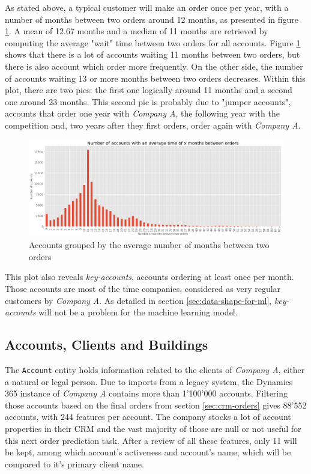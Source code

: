 As stated above, a typical customer will make an order once per year, with a number of months between two orders around 12 months, as presented in figure \ref{fig:orders-account-counts}. A mean of 12.67 months and a median of 11 months are retrieved by computing the average "wait" time between two orders for all accounts. Figure \ref{fig:orders-account-counts} shows that there is a lot of accounts waiting 11 months between two orders, but there is also account which order more frequently. On the other side, the number of accounts waiting 13 or more months between two orders decreases. Within this plot, there are two pics: the first one logically around 11 months and a second one around 23 months. This second pic is probably due to "jumper accounts", accounts that order one year with \textit{Company A}, the following year with the competition and, two years after they first orders, order again with \textit{Company A}. 

\begin{figure}[h]
    \centering
    \includegraphics[width=15cm]{images/accounts-average-time-orders.png}
    \caption{Accounts grouped by the average number of months between two orders}
    \label{fig:orders-account-counts}
\end{figure}

This plot also reveals \textit{key-accounts}, accounts ordering at least once per month. Those accounts are most of the time companies, considered as very regular customers by \textit{Company A}. As detailed in section \ref{sec:data-shape-for-ml}, \textit{key-accounts} will not be a problem for the machine learning model.





\subsection{Accounts, Clients and Buildings}\label{sec:crm-accounts}
The \texttt{Account} entity holds information related to the clients of \textit{Company A}, either a natural or legal person. Due to imports from a legacy system, the Dynamics 365 instance of \textit{Company A} contains more than 1'100'000 accounts. Filtering those accounts based on the final orders from section \ref{sec:crm-orders} gives 88'552 accounts, with 244 features per account. The company stocks a lot of account properties in their CRM and the vast majority of those are null or not useful for this next order prediction task. After a review of all these features, only 11 will be kept, among which account's activeness and account's name, which will be compared to it's primary client name.


